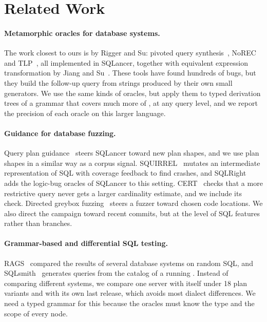 \section{Related Work}
\label{sec:related}

\paragraph{Metamorphic oracles for database systems.} The work closest to ours
is by Rigger and Su: pivoted query synthesis~\cite{rigger2020pqs},
NoREC~\cite{rigger2020norec} and TLP~\cite{rigger2020tlp}, all implemented in
SQLancer, together with equivalent expression transformation by Jiang and
Su~\cite{jiang2024eet}. These tools have found hundreds of bugs, but they build
the follow-up query from strings produced by their own small generators. We use
the same kinds of oracles, but apply them to typed derivation trees of a grammar
that covers much more of \pg, at any query level, and we report the precision
of each oracle on this larger language.

\paragraph{Guidance for database fuzzing.} Query plan guidance~\cite{ba2023qpg}
steers SQLancer toward new plan shapes, and we use plan shapes in a similar way
as a corpus signal. SQUIRREL~\cite{zhong2020squirrel} mutates an intermediate
representation of SQL with coverage feedback to find crashes, and
SQLRight~\cite{liang2022sqlright} adds the logic-bug oracles of SQLancer to this
setting. CERT~\cite{ba2024cert} checks that a more restrictive query never gets a
larger cardinality estimate, and we include its check. Directed greybox
fuzzing~\cite{bohme2017aflgo} steers a fuzzer toward chosen code locations. We
also direct the campaign toward recent commits, but at the level of SQL features
rather than branches.

\paragraph{Grammar-based and differential SQL testing.} RAGS~\cite{slutz1998rags}
compared the results of several database systems on random SQL, and
SQLsmith~\cite{sqlsmith} generates queries from the catalog of a running \pg.
Instead of comparing different systems, we compare one server with itself under
18 plan variants and with its own last release, which avoids most dialect
differences. We need a typed grammar for this because the oracles must know the
type and the scope of every node.


